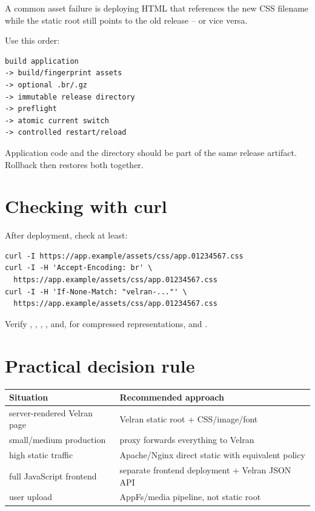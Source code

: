 A common asset failure is deploying HTML that references the new CSS filename while the static root still points to the old release -- or vice versa.

Use this order:

\begin{lstlisting}
build application
-> build/fingerprint assets
-> optional .br/.gz
-> immutable release directory
-> preflight
-> atomic current switch
-> controlled restart/reload
\end{lstlisting}

Application code and the  directory should be part of the same release artifact. Rollback then restores both together.

\section{Checking with curl}

After deployment, check at least:

\begin{lstlisting}
curl -I https://app.example/assets/css/app.01234567.css
curl -I -H 'Accept-Encoding: br' \
  https://app.example/assets/css/app.01234567.css
curl -I -H 'If-None-Match: "velran-..."' \
  https://app.example/assets/css/app.01234567.css
\end{lstlisting}

Verify , , , , and, for compressed representations,  and .

\section{Practical decision rule}

\begin{center}
\begin{tabularx}{\textwidth}{@{}lY@{}}
\toprule
Situation & Recommended approach \\
\midrule
server-rendered Velran page & Velran static root + CSS/image/font \\
small/medium production & proxy forwards everything to Velran \\
high static traffic & Apache/Nginx direct static with equivalent policy \\
full JavaScript frontend & separate frontend deployment + Velran JSON API \\
user upload & AppFs/media pipeline, not static root \\
\bottomrule
\end{tabularx}
\end{center}

